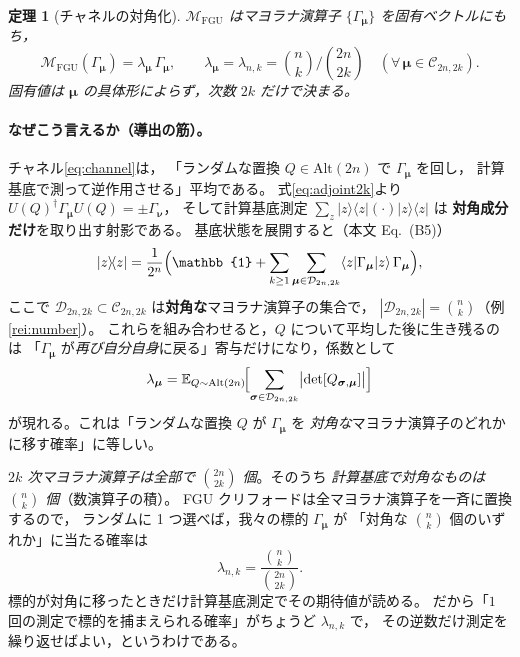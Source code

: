 \documentclass[11pt,a4paper]{ltjsarticle}
\newcommand{\bra}[1]{\langle #1|}
\newcommand{\ket}[1]{|#1\rangle}
\newcommand{\ketbra}[2]{|#1\rangle\!\langle #2|}
\newcommand{\E}{\mathbb{E}}
\newcommand{\Id}{\mathbb{1}}
\newcommand{\Mc}{\mathcal{M}}
\newcommand{\Cc}{\mathcal{C}}
\newcommand{\Dc}{\mathcal{D}}
\newcommand{\FGU}{\mathrm{FGU}}
\newcommand{\Alt}{\mathrm{Alt}}
\theoremstyle{definition}
\theoremstyle{plain}
\newtheorem{teiri}{定理}[section]
\begin{document}
\begin{teiri}[チャネルの対角化]\label{thm:diag}
$\Mc_\FGU$ はマヨラナ演算子 $\{\Gamma_{\bm\mu}\}$ を固有ベクトルにもち，
\begin{equation}
  \Mc_\FGU(\Gamma_{\bm\mu})=\lambda_{\bm\mu}\,\Gamma_{\bm\mu},\qquad
  \lambda_{\bm\mu}=\lambda_{n,k}=\binom{n}{k}\Big/\binom{2n}{2k}
  \quad(\forall\,\bm\mu\in\Cc_{2n,2k}).
  \label{eq:eigen}
\end{equation}
固有値は $\bm\mu$ の具体形によらず，次数 $2k$ だけで決まる。
\end{teiri}

\paragraph{なぜこう言えるか（導出の筋）。}
チャネル\eqref{eq:channel}は，
「ランダムな置換 $Q\in\Alt(2n)$ で $\Gamma_{\bm\mu}$ を回し，
計算基底で測って逆作用させる」平均である。
式\eqref{eq:adjoint2k}より $U(Q)^\dagger\Gamma_{\bm\mu}U(Q)=\pm\Gamma_{\bm\nu}$，
そして計算基底測定 $\sum_z\ketbra zz(\cdot)\ketbra zz$ は
\textbf{対角成分だけ}を取り出す射影である。
基底状態を展開すると（本文 Eq.~(B5)）
\[
  \ketbra zz=\frac1{2^n}\Bigl(\Id+\sum_{k\ge1}\sum_{\bm\mu\in\Dc_{2n,2k}}
     \bra z\Gamma_{\bm\mu}\ket z\,\Gamma_{\bm\mu}\Bigr),
\]
ここで $\Dc_{2n,2k}\subset\Cc_{2n,2k}$ は\textbf{対角な}マヨラナ演算子の集合で，
$|\Dc_{2n,2k}|=\binom nk$（例\ref{rei:number}）。
これらを組み合わせると，$Q$ について平均した後に生き残るのは
「$\Gamma_{\bm\mu}$ が\emph{再び自分自身}に戻る」寄与だけになり，係数として
\begin{equation}
  \lambda_{\bm\mu}
  =\E_{Q\sim\Alt(2n)}\!\Bigl[\sum_{\bm\sigma\in\Dc_{2n,2k}}
     \bigl|\det[Q_{\bm\sigma,\bm\mu}]\bigr|\Bigr]
  \label{eq:lambdaexp}
\end{equation}
が現れる。これは「ランダムな置換 $Q$ が $\Gamma_{\bm\mu}$ を
\emph{対角な}マヨラナ演算子のどれかに移す確率」に等しい。

\begin{ideabox}[title=\textbf{数え上げによる直感的理解}]
\emph{$2k$ 次マヨラナ演算子は全部で $\binom{2n}{2k}$ 個}。そのうち
\emph{計算基底で対角なものは $\binom{n}{k}$ 個}（数演算子の積）。
FGU クリフォードは全マヨラナ演算子を一斉に置換するので，
ランダムに 1 つ選べば，我々の標的 $\Gamma_{\bm\mu}$ が
「対角な $\binom nk$ 個のいずれか」に当たる確率は
\[
  \lambda_{n,k}=\frac{\binom nk}{\binom{2n}{2k}} .
\]
標的が対角に移ったときだけ計算基底測定でその期待値が読める。
だから「$1$ 回の測定で標的を捕まえられる確率」がちょうど $\lambda_{n,k}$ で，
その逆数だけ測定を繰り返せばよい，というわけである。
\end{ideabox}
\end{document}
